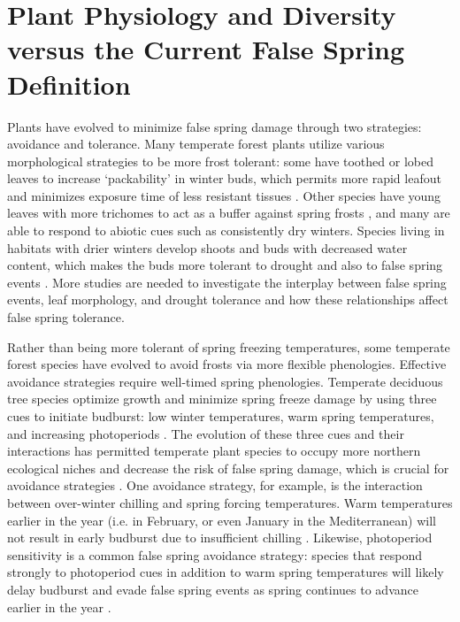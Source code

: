 \documentclass{article}\usepackage[]{graphicx}\usepackage[]{color}
\begin{document}
\section {Plant Physiology and Diversity versus the Current False Spring Definition}
Plants have evolved to minimize false spring damage through two strategies: avoidance and tolerance. Many temperate forest plants utilize various morphological strategies to be more frost tolerant: some have toothed or lobed leaves to increase `packability' in winter buds, which permits more rapid leafout and minimizes exposure time of less resistant tissues \citep{Edwards2017}. Other species have young leaves with more trichomes to act as a buffer against spring frosts \citep{Agrawal2004, Prozherina2003}, and many are able to respond to abiotic cues such as consistently dry winters. Species living in habitats with drier winters develop shoots and buds with decreased water content, which makes the buds more tolerant to drought and also to false spring events \citep{Beck2007, Morin2007, Nielsen2009, Poirier2010, Kathke2011, Hofmann2015}. More studies are needed to investigate the interplay between false spring events, leaf morphology, and drought tolerance and how these relationships affect false spring tolerance. 

Rather than being more tolerant of spring freezing temperatures, some temperate forest species have evolved to avoid frosts via more flexible phenologies. Effective avoidance strategies require well-timed spring phenologies. Temperate deciduous tree species optimize growth and minimize spring freeze damage by using three cues to initiate budburst: low winter temperatures, warm spring temperatures, and increasing photoperiods \citep{Chuine2010}. The evolution of these three cues and their interactions has permitted temperate plant species to occupy more northern ecological niches and decrease the risk of false spring damage, which is crucial for avoidance strategies \citep{Samish1954}. One avoidance strategy, for example, is the interaction between over-winter chilling and spring forcing temperatures. Warm temperatures earlier in the year (i.e. in February, or even January in the Mediterranean) will not result in early budburst due to insufficient chilling \citep{Basler2012}. Likewise, photoperiod sensitivity is a common false spring avoidance strategy: species that respond strongly to photoperiod cues in addition to warm spring temperatures will likely delay budburst and evade false spring events as spring continues to advance earlier in the year \citep{Basler2014}. 
\end{document}
